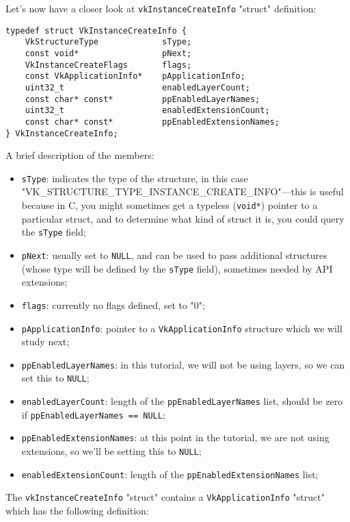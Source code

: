 \documentclass[12pt,letterpaper]{article}
\newcommand{\cil}[1]{\texttt{#1}}
\begin{document}
	Let's now have a closer look at \cil{vkInstanceCreateInfo} "struct" definition:
		\begin{verbatim}
typedef struct VkInstanceCreateInfo {
	VkStructureType             sType;
	const void*                 pNext;
	VkInstanceCreateFlags       flags;
	const VkApplicationInfo*    pApplicationInfo;
	uint32_t                    enabledLayerCount;
	const char* const*          ppEnabledLayerNames;
	uint32_t                    enabledExtensionCount;
	const char* const*          ppEnabledExtensionNames;
} VkInstanceCreateInfo;
		\end{verbatim}
	A brief description of the members:
		\begin{itemize}
			\item \cil{sType}: indicates the type of the structure, in this case "VK\_STRUCTURE\_TYPE\_INSTANCE\_CREATE\_INFO"---this is useful because in C, you might sometimes get a typeless (\cil{void*}) pointer to a particular struct, and to determine what kind of struct it is, you could query the \cil{sType} field;
			
			\item \cil{pNext}: usually set to \cil{NULL}, and can be used to pass additional structures (whose type will be defined by the \cil{sType} field), sometimes needed by API extensions;
			
			\item \cil{flags}: currently no flags defined, set to "0";
			
			\item \cil{pApplicationInfo}: pointer to a \cil{VkApplicationInfo} structure which we will study next;
			
			\item \cil{ppEnabledLayerNames}: in this tutorial, we will not be using layers, so we can set this to \cil{NULL};
			
			\item \cil{enabledLayerCount}: length of the \cil{ppEnabledLayerNames} list, should be zero if \cil{ppEnabledLayerNames == NULL};
			
			\item \cil{ppEnabledExtensionNames}: at this point in the tutorial, we are not using extensions, so we'll be setting this to \cil{NULL};
			
			\item \cil{enabledExtensionCount}: length of the \cil{ppEnabledExtensionNames} list;
		\end{itemize}
	The \cil{vkInstanceCreateInfo} "struct" contains a \cil{VkApplicationInfo} "struct" which has the following definition:
\end{document}
